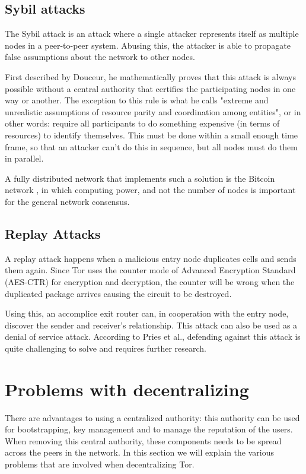 \documentclass{article}
\begin{document}
	\subsection{Sybil attacks}
		The Sybil attack is an attack where a single attacker represents itself as multiple nodes in a peer-to-peer system. Abusing this, the attacker is able to propagate false assumptions about the network to other nodes.
		
		First described by Douceur, he \cite{douceur2002sybil} mathematically proves that this attack is always possible without a central authority that certifies the participating nodes in one way or another. The exception to this rule is what he calls "extreme and unrealistic assumptions of resource parity and coordination among entities", or in other words: require all participants to do something expensive (in terms of resources) to identify themselves. This must be done within a small enough time frame, so that an attacker can't do this in sequence, but all nodes must do them in parallel.
		
		A fully distributed network that implements such a solution is the Bitcoin network \cite{nakamoto2008bitcoin}, in which computing power, and not the number of nodes is important for the general network consensus.
				
	\subsection{Replay Attacks}
		A replay attack \cite{pries2008new} happens when a malicious entry node duplicates cells and sends them again. Since Tor uses the counter mode of Advanced Encryption Standard (AES-CTR) for encryption and decryption, the counter will be wrong when the duplicated package arrives causing the circuit to be destroyed.

		Using this, an accomplice exit router can, in cooperation with the entry node, discover the sender and receiver's relationship. This attack can also be used as a denial of service attack. According to Pries et al., defending against this attack is quite challenging to solve and requires further research.

\section{Problems with decentralizing}
	\label{sec:problems}

	There are advantages to using a centralized authority: this authority can be used for bootstrapping, key management and to manage the reputation of the users. When removing this central authority, these components needs to be spread across the peers in the network. In this section we will explain the various problems that are involved when decentralizing Tor.
\end{document}
